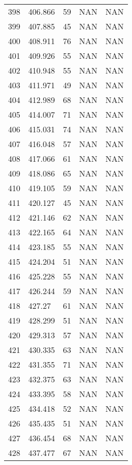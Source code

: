 \documentclass{article}
\begin{document}
\begin{longtable}{@{}lllll@{}}
				398 & 406.866 & 59    & NAN   & NAN   \\
				399 & 407.885 & 45    & NAN   & NAN   \\
				400 & 408.911 & 76    & NAN   & NAN   \\
				401 & 409.926 & 55    & NAN   & NAN   \\
				402 & 410.948 & 55    & NAN   & NAN   \\
				403 & 411.971 & 49    & NAN   & NAN   \\
				404 & 412.989 & 68    & NAN   & NAN   \\
				405 & 414.007 & 71    & NAN   & NAN   \\
				406 & 415.031 & 74    & NAN   & NAN   \\
				407 & 416.048 & 57    & NAN   & NAN   \\
				408 & 417.066 & 61    & NAN   & NAN   \\
				409 & 418.086 & 65    & NAN   & NAN   \\
				410 & 419.105 & 59    & NAN   & NAN   \\
				411 & 420.127 & 45    & NAN   & NAN   \\
				412 & 421.146 & 62    & NAN   & NAN   \\
				413 & 422.165 & 64    & NAN   & NAN   \\
				414 & 423.185 & 55    & NAN   & NAN   \\
				415 & 424.204 & 51    & NAN   & NAN   \\
				416 & 425.228 & 55    & NAN   & NAN   \\
				417 & 426.244 & 59    & NAN   & NAN   \\
				418 & 427.27  & 61    & NAN   & NAN   \\
				419 & 428.299 & 51    & NAN   & NAN   \\
				420 & 429.313 & 57    & NAN   & NAN   \\
				421 & 430.335 & 63    & NAN   & NAN   \\
				422 & 431.355 & 71    & NAN   & NAN   \\
				423 & 432.375 & 63    & NAN   & NAN   \\
				424 & 433.395 & 58    & NAN   & NAN   \\
				425 & 434.418 & 52    & NAN   & NAN   \\
				426 & 435.435 & 51    & NAN   & NAN   \\
				427 & 436.454 & 68    & NAN   & NAN   \\
				428 & 437.477 & 67    & NAN   & NAN   \\

\end{longtable}
\end{document}
